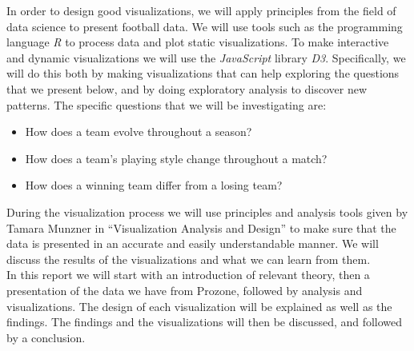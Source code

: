 \documentclass[Report.tex]{subfiles}
\begin{document}
In order to design good visualizations, we will apply principles from the field of data science to present football data. We will use tools such as the programming language \emph{R} to process data and plot static visualizations. To make interactive and dynamic visualizations we will use the \emph{JavaScript} library \emph{D3}. 
Specifically, we will do this both by making visualizations that can help exploring the questions that we present below, and by doing exploratory analysis to discover new patterns. The specific questions that we will be investigating are: 
\begin{itemize}
\item How does a team evolve throughout a season?
\item How does a team’s playing style change throughout a match?
\item How does a winning team differ from a losing team?
\end{itemize}
During the visualization process we will use principles and analysis tools given by Tamara Munzner in “Visualization Analysis and Design” \cite{Tamara} to make sure that the data is presented in an accurate and easily understandable manner. We will discuss the results of the visualizations and what we can learn from them.
\\

In this report we will start with an introduction of relevant theory, then a presentation of the data we have from Prozone, followed by analysis and visualizations. The design of each visualization will be explained as well as the findings. The findings and the visualizations will then be discussed, and followed by a conclusion.
\end{document}

